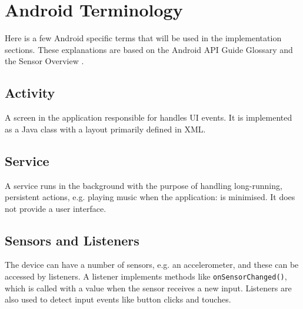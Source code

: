 \section{Android Terminology}
Here is a few Android specific terms that will be used in the implementation sections. These explanations are based on the Android API Guide Glossary \cite{android:terms} and the Sensor Overview \cite{android:sensor}.

\subsection*{Activity}
A screen in the application responsible for handles UI events. It is implemented as a Java class with a layout primarily defined in XML.


\subsection*{Service}
A service runs in the background with the purpose of handling long-running, persistent actions, e.g. playing music when the application: is minimised. It does not provide a user interface.

\subsection*{Sensors and Listeners}
The device can have a number of sensors, e.g. an accelerometer, and these can be accessed by listeners. A listener implements methods like \texttt{onSensorChanged()}, which is called with a value when the sensor receives a new input. Listeners are also used to detect input events like button clicks and touches.
